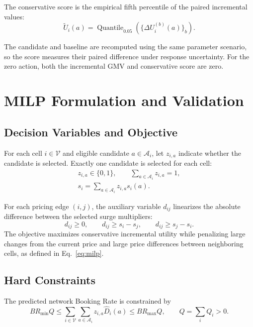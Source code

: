 \documentclass[a4paper,10pt,twocolumn]{article}
\newcommand{\Quant}{\operatorname{Quantile}}
\newcommand{\Vset}{\mathcal V}
\begin{document}
The conservative score is the empirical fifth percentile of the paired
incremental values:
\begin{equation}
\widetilde U_i(a)
=
\Quant_{0.05}
\left(\{\Delta U_i^{(b)}(a)\}_b\right).
\end{equation}

The candidate and baseline are recomputed using the same parameter scenario,
so the score measures their paired difference under response uncertainty.
For the zero action, both the incremental GMV and conservative score are zero.

\section{MILP Formulation and Validation}\label{app:milp}
\subsection{Decision Variables and Objective}
For each cell $i\in\Vset$ and eligible candidate
$a\in\mathcal A_i$, let $z_{i,a}$ indicate whether the candidate is
selected. Exactly one candidate is selected for each cell:
\begin{equation}
\begin{gathered}
 z_{i,a}\in\{0,1\},\qquad
 \sum_{a\in\mathcal A_i}z_{i,a}=1,\\
 s_i=\sum_{a\in\mathcal A_i}z_{i,a}s_i(a).
\end{gathered}
\label{eq:milpvars}
\end{equation}

For each pricing edge $(i,j)$, the auxiliary variable $d_{ij}$ linearizes
the absolute difference between the selected surge multipliers:
\begin{equation}
 d_{ij}\ge0,\qquad
 d_{ij}\ge s_i-s_j,\qquad
 d_{ij}\ge s_j-s_i.
\end{equation}
The objective maximizes conservative incremental utility while penalizing
large changes from the current price and large price differences between
neighboring cells, as defined in Eq.~\eqref{eq:milp}.

\subsection{Hard Constraints}
The predicted network Booking Rate is constrained by
\begin{equation}
 BR_{\min}Q
 \le
 \sum_{i\in\Vset}\sum_{a\in\mathcal A_i}
 z_{i,a}\widehat D_i(a)
 \le
 BR_{\max}Q,
 \qquad Q=\sum_i Q_i>0.
\end{equation}
\end{document}
